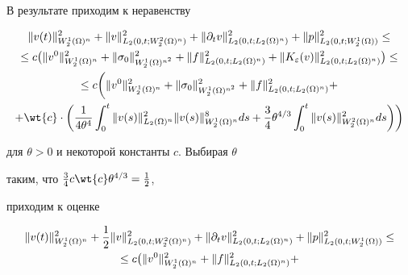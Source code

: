\begin{pf}
В результате приходим к неравенству


\begin{multline*}


\|v(t)\|_{W^1_2(\Om)^n}^2 +


\|v\|_{L_2(0,t;W_2^2(\Om)^n)}^2 +\|\partial_t


v\|_{L_2(0,t;L_2(\Om)^n)}^2 +\|p\|_{L_2(0,t;W_2^1(\Om))}^2 \le\\


%


\le c \big(\|v^0\|_{W^1_2(\Om)^n}^2 +


\|\sig_0\|_{W^1_2(\Om)^{n^2}}^2+


\|f\|_{L_2(0,t;L_2(\Om)^n)}^2 +


\|K_{\eps}(v)\|_{L_2(0,t;L_2(\Om)^n)}^2 \big) \le\\


%


\le c \bigg(\|v^0\|_{W^1_2(\Om)^n}^2 +


\|\sig_0\|_{W^1_2(\Om)^{n^2}}^2+


\|f\|_{L_2(0,t;L_2(\Om)^n)}^2 + \\


%


+\wt{c }\cdot


\bigg({{\frac{1}{4\theta^4}}\intl 0 t


\|v(s)\|_{L_2(\Om)^n}^2\|v(s)\|_{W_2^1(\Om)^n}^8 ds +


\frac{3}{4}\theta^{4/3} \intl 0 t \|v(s)\|_{W_2^2(\Om)^n}^2 ds}


\bigg)\bigg)


\end{multline*}


для $\theta>0$ и некоторой константы $c$. Выбирая $\theta$


таким, что $\frac{3}{4} c \wt{c} \theta^{4/3}=\frac{1}{2}$,


приходим к оценке


\begin{multline}


\label{e54} \|v(t)\|_{W^1_2(\Om)^n}^2


+\frac{1}{2}\|v\|_{L_2(0,t;W_2^2(\Om)^n)}^2 +


\|\partial_t v\|_{L_2(0,t;L_2(\Om)^n)}^2 


+\|p\|_{L_2(0,t;W_2^1(\Om))}^2 \le\\


%


\le c \big(\|v^0\|_{W^1_2(\Om)^n}^2 +


\|f\|_{L_2(0,t;L_2(\Om)^n)}^2 +



\end{multline}
\end{pf}

